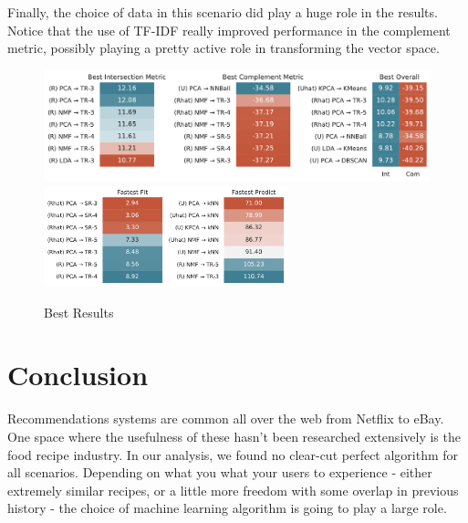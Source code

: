 \documentclass[11pt]{article}
\begin{document}
Finally, the choice of data in this scenario did play a huge role in the results. Notice that the use of TF-IDF really improved performance in the complement metric, possibly playing a pretty active role in transforming the vector space.  
\begin{figure}[b!]
\centering
\includegraphics[width=1\textwidth]{figs/best_metric.pdf}
\includegraphics[width=0.63\textwidth]{figs/best_time.pdf}
\caption{Best Results}
\label{fig:best}
\end{figure}

\section{Conclusion}

Recommendations systems are common all over the web from Netflix to eBay. One space where the usefulness of these hasn't been researched extensively is the food recipe industry. In our analysis, we found no clear-cut perfect algorithm for all scenarios. Depending on what you what your users to experience - either extremely similar recipes, or a little more freedom with some overlap in previous history - the choice of machine learning algorithm is going to play a large role. 


\end{document}
